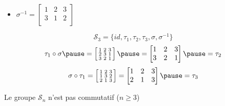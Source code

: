\begin{frame}
\begin{minipage}{0.39\textwidth}
\begin{itemize}
 \item $\sigma^{-1} = \left[\begin{smallmatrix} 
 1 & 2 & 3 \\  
 3 & 1 & 2 \\     
        \end{smallmatrix} \right]
$ 
\end{itemize}  
\end{minipage}
\pause
\begin{minipage}{0.39\textwidth}
$$\mathcal{S}_3 = \big\{id,\tau_1,\tau_2,\tau_3,\sigma,\sigma^{-1}\big\}$$  
\pause
\medskip 
$$\tau_1 \circ \sigma
\pause 
=\left[\begin{smallmatrix} 
 1 & 2 & 3 \\  
 2 & 3 & 1 \\  
 3 & 2 & 1 \\    
        \end{smallmatrix} \right]
\pause
= \left[\begin{matrix} 
 1 & 2 & 3 \\  
 3 & 2 & 1 \\    
        \end{matrix} \right]
\pause
= \tau_2
$$
\pause
$$
\sigma \circ \tau_1 
= \left[\begin{smallmatrix} 
 1 & 2 & 3 \\  
 1 & 3 & 2 \\ 
 2 & 1 & 3 \\     
        \end{smallmatrix} \right]
= \left[\begin{matrix} 
 1 & 2 & 3 \\  
 2 & 1 & 3 \\     
        \end{matrix} \right]
\pause
= \tau_3
 $$
\end{minipage}

\pause
\bigskip 

\begin{lemme}
Le groupe $\mathcal{S}_n$ n'est pas commutatif ($n\ge3$)
\end{lemme}
\end{frame}



